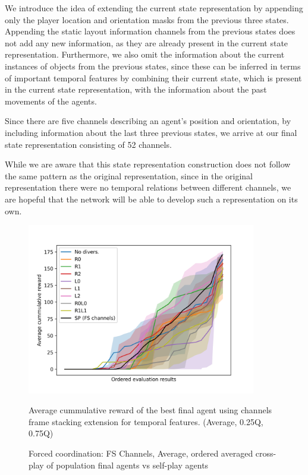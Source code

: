 We introduce the idea of extending the current state representation by appending only the player location and orientation masks from the previous three states.
Appending the static layout information channels from the previous states does not add any new information, as they are already present in the current state representation.
Furthermore, we also omit the information about the current instances of objects from the previous states, since these can be inferred in terms of important temporal features by combining their current state, which is present in the current state representation, with the information about the past movements of the agents.

Since there are five channels describing an agent's position and orientation, by including information about the last three previous states, we arrive at our final state representation consisting of 52 channels.

While we are aware that this state representation construction does not follow the same pattern as the original representation, since in the original representation there were no temporal relations between different channels, we are hopeful that the network will be able to develop such a representation on its own.

\begin{figure}[!ht]
    \centering
    \includegraphics*[width=10cm]{../img/FSChannelsOrderedAvg.png}

    \caption{Forced coordination: FS Channels, Average, ordered averaged cross-play of population final agents vs self-play agents}
    \label{FSChannelsOrderedAvg}
    \medskip
    \small 
    Average cummulative reward of the best final agent using channels frame stacking extension for temporal features.    
    (Average, 0.25Q, 0.75Q)

\end{figure}

